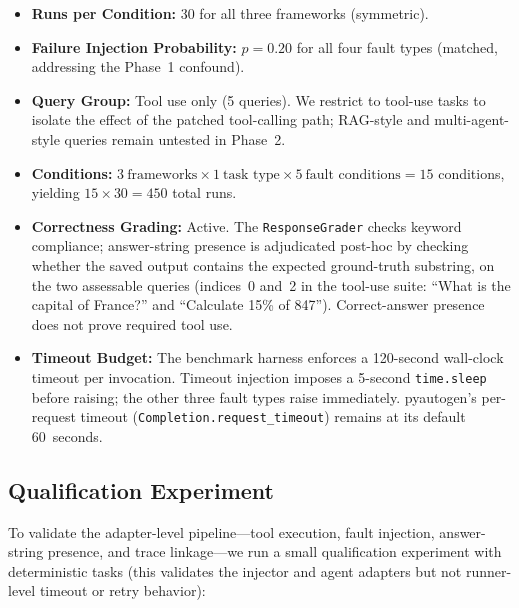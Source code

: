 \documentclass[make,article,submit,moreauthors,pdftex]{mdpi}
\begin{document}
\begin{itemize}
  \item \textbf{Runs per Condition:} 30 for all three frameworks (symmetric).
  \item \textbf{Failure Injection Probability:} $p = 0.20$ for all four fault types (matched, addressing the Phase~1 confound).
  \item \textbf{Query Group:} Tool use only (5 queries). We restrict to tool-use tasks to isolate the effect of the patched tool-calling path; RAG-style and multi-agent-style queries remain untested in Phase~2.
  \item \textbf{Conditions:} $3~\text{frameworks} \times 1~\text{task type} \times 5~\text{fault conditions} = 15$ conditions, yielding $15 \times 30 = 450$ total runs.
  \item \textbf{Correctness Grading:} Active. The \texttt{ResponseGrader} checks keyword compliance; answer-string presence is adjudicated post-hoc by checking whether the saved output contains the expected ground-truth substring, on the two assessable queries (indices~0 and~2 in the tool-use suite: ``What is the capital of France?'' and ``Calculate 15\% of 847''). Correct-answer presence does not prove required tool use.
  \item \textbf{Timeout Budget:} The benchmark harness enforces a 120-second wall-clock timeout per invocation. Timeout injection imposes a 5-second \texttt{time.sleep} before raising; the other three fault types raise immediately. pyautogen's per-request timeout (\texttt{Completion.request\_timeout}) remains at its default 60~seconds.
\end{itemize}

\subsection{Qualification Experiment}\label{sec:qualification-method}

{To validate the adapter-level pipeline---tool execution, fault injection, answer-string presence, and trace linkage---we run a small qualification experiment with deterministic tasks (this validates the injector and agent adapters but not runner-level timeout or retry behavior):}
\end{document}

